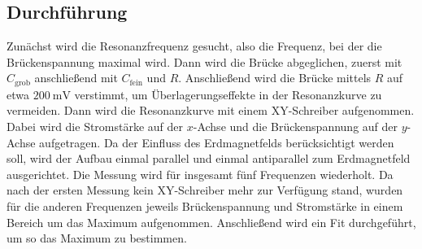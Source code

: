 \subsection{Durchführung}
Zunächst wird die Resonanzfrequenz gesucht, also die Frequenz, bei der die Brückenspannung maximal wird. Dann wird die Brücke abgeglichen, zuerst mit $C_\mathrm{grob}$ anschließend mit $C_\mathrm{fein}$ und $R$. Anschließend wird die Brücke mittels $R$ auf etwa $\SI{200}{\milli\volt}$ verstimmt, um Überlagerungseffekte in der Resonanzkurve zu vermeiden. Dann wird die Resonanzkurve mit einem XY-Schreiber aufgenommen. Dabei wird die Stromstärke auf der $x$-Achse und die Brückenspannung auf der $y$-Achse aufgetragen. Da der Einfluss des Erdmagnetfelds berücksichtigt werden soll, wird der Aufbau einmal parallel und einmal antiparallel zum Erdmagnetfeld ausgerichtet. Die Messung wird für insgesamt fünf Frequenzen wiederholt. Da nach der ersten Messung kein XY-Schreiber mehr zur Verfügung stand, wurden für die anderen Frequenzen jeweils Brückenspannung und Stromstärke in einem Bereich um das Maximum aufgenommen. Anschließend wird ein Fit durchgeführt, um so das Maximum zu bestimmen.
